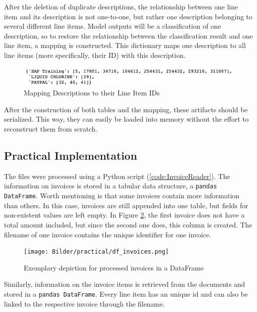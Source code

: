 	After the deletion of duplicate descriptions, the relationship between one line item and its description is not one-to-one, but rather one description belonging to several different line items. Model outputs will be a classification of one description, so to restore the relationship between the classification result and one line item, a mapping is constructed.
	This dictionary maps one description to all line items (more specifically, their ID) with this description.
	\begin{figure}[ht]
		\centering
		\includegraphics[width=\linewidth]{Bilder/description_map.png}
		\caption{Mapping Descriptions to their Line Item IDs}
		\label{fig:mapping}
	\end{figure}


	After the construction of both tables and the mapping, these artifacts should be serialized. This way, they can easily be loaded into memory without the effort to reconstruct them from scratch.
	
    \subsection{Practical Implementation}
	
	The files were processed using a Python script (\ref{code:InvoiceReader}). The information on invoices is stored in a tabular data structure, a \lstinline|pandas DataFrame|. Worth mentioning is that some invoices contain more information than others. In this case, invoices are still appended into one table, but fields for non-existent values are left empty. In Figure \ref{fig:df-invoices}, the first invoice does not have a total amount included, but since the second one does, this column is created.
	The filename of one invoice contains the unique identifier for one invoice.
	
	\begin{figure}[ht]
		\centering
		\texttt{[image: Bilder/practical/df\_invoices.png]}
		\caption{Exemplary depiction for processed invoices in a DataFrame}
		\label{fig:df-invoices}
	\end{figure}

	Similarly, information on the invoice items is retrieved from the documents and stored in a \lstinline|pandas DataFrame|. Every line item has an unique id and can also be linked to the respective invoice through the filename.
	
